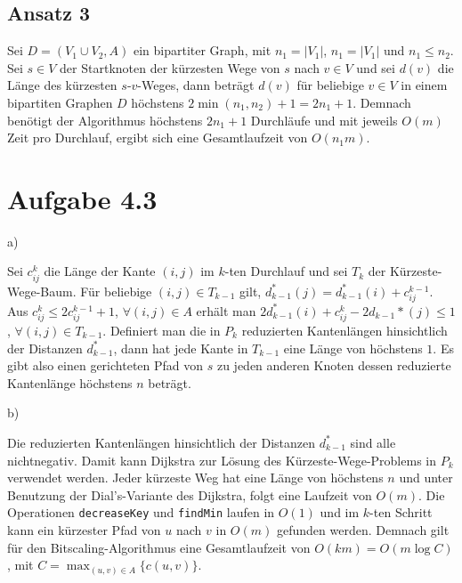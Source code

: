 \documentclass{scrartcl}
\begin{document}
\subsection*{Ansatz 3}

Sei $D= \left( V_{1} \cup V_{2}, A \right)$ ein bipartiter Graph, mit $n_{1} = \vert V_{1} \vert$, $n_{1} = \vert V_{1} \vert$ und $n_{1} \leq n_{2}$. Sei $s \in V$ der Startknoten der kürzesten Wege von $s$ nach $v \in V$ und sei $d(v)$ die Länge des kürzesten $s$-$v$-Weges, dann beträgt $d(v)$ für beliebige $v \in V$ in einem bipartiten Graphen $D$ höchstens $2 \min \left( n_{1}, n_{2} \right) + 1 = 2n_{1} + 1$. Demnach benötigt der Algorithmus höchstens $2n_{1} + 1$ Durchläufe und mit jeweils $O(m)$ Zeit pro Durchlauf, ergibt sich eine Gesamtlaufzeit von $O(n_{1}m)$.

\section{Aufgabe 4.3}
\begin{description}
\item[a)]
\end{description}
Sei $c_{ij}^{k}$ die Länge der Kante $(i,j)$ im $k$-ten Durchlauf und sei $T_{k}$ der Kürzeste-Wege-Baum. Für beliebige $(i,j) \in T_{k-1}$ gilt, $d_{k-1}^{*} (j) = d_{k-1}^{*} (i) + c_{ij}^{k-1}$. Aus $c_{ij}^{k} \leq 2c_{ij}^{k-1} + 1$, $\forall (i,j) \in A$ erhält man $2d_{k-1}^{*} (i) + c_{ij}^{k} - 2d_{k-1}{*} (j) \leq 1$, $\forall (i,j) \in T_{k-1}$. Definiert man die in $P_{k}$ reduzierten Kantenlängen hinsichtlich der Distanzen $d_{k-1}^{*}$, dann hat jede Kante in $T_{k-1}$ eine Länge von höchstens $1$. Es gibt also einen gerichteten Pfad von $s$ zu jeden anderen Knoten dessen reduzierte Kantenlänge höchstens $n$ beträgt.

\begin{description}
\item[b)]
\end{description}
Die reduzierten Kantenlängen hinsichtlich der Distanzen $d_{k-1}^{*}$ sind alle nichtnegativ. Damit kann Dijkstra  zur Lösung des Kürzeste-Wege-Problems in $P_{k}$ verwendet werden. Jeder kürzeste Weg hat eine Länge von höchstens $n$ und unter Benutzung der Dial's-Variante des Dijkstra, folgt eine Laufzeit von $O(m)$. Die Operationen \verb+decreaseKey+ und \verb+findMin+ laufen in $O(1)$ und im $k$-ten Schritt kann ein kürzester Pfad von $u$ nach $v$ in $O(m)$ gefunden werden. Demnach gilt für den Bitscaling-Algorithmus eine Gesamtlaufzeit von $O(km) = O(m \log C)$, mit $C = \max_{(u,v) \in A} \lbrace c(u,v) \rbrace$.
\newpage
\end{document}
